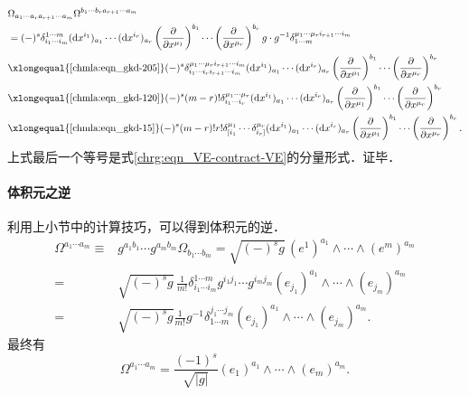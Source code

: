 \begin{align*}
    &\Omega_{a_1 \cdots a_r a_{r+1} \cdots a_m}
    \Omega^{{b_1 \cdots b_r} a_{r+1} \cdots a_m} \\
   &= (-)^s \delta_{i_1 \cdots i_m}^{1 \cdots m}
    ({\rm d}x^{i_{1}})_{a_{1}}  \cdots  ({\rm d}x^{i_r})_{a_r}
    \left(\frac{\partial }{\partial x^{\mu_1}}\right) ^{b_1} \cdots
    \left(\frac{\partial }{\partial x^{\mu_r}}\right) ^{b_r}
    g\cdot g^{-1}\delta^{\mu_1 \cdots\mu_r i_{r+1}\cdots i_m}_{1 \cdots m} \\
   &\xlongequal{\ref{chmla:eqn_gkd-205}} (-)^s
     \delta_{i_1 \cdots i_r i_{r+1}\cdots i_m}^{\mu_1 \cdots\mu_r i_{r+1}\cdots i_m}
    ({\rm d}x^{i_{1}})_{a_{1}}  \cdots  ({\rm d}x^{i_r})_{a_r}
    \left(\frac{\partial }{\partial x^{\mu_1}}\right) ^{b_1} \cdots
    \left(\frac{\partial }{\partial x^{\mu_r}}\right) ^{b_r} \\
   &\xlongequal{\ref{chmla:eqn_gkd-120}} (-)^s
   (m-r)! \delta^{\mu_1 \cdots \mu_{r}}_{i_1 \cdots i_{r}}
   ({\rm d}x^{i_{1}})_{a_{1}}  \cdots  ({\rm d}x^{i_r})_{a_r}
   \left(\frac{\partial }{\partial x^{\mu_1}}\right) ^{b_1} \cdots
   \left(\frac{\partial }{\partial x^{\mu_r}}\right) ^{b_r} \\
   &\xlongequal{\ref{chmla:eqn_gkd-15} } (-)^s (m-r)! r!
   \delta_{\lbrack i_1}^{\mu_1} \cdots \delta_{i_r \rbrack}^{\mu_r}
      ({\rm d}x^{i_{1}})_{a_{1}}  \cdots  ({\rm d}x^{i_r})_{a_r}
   \left(\frac{\partial }{\partial x^{\mu_1}}\right) ^{b_1} \cdots
   \left(\frac{\partial }{\partial x^{\mu_r}}\right) ^{b_r} .
\end{align*}
上式最后一个等号是式\eqref{chrg:eqn_VE-contract-VE}的分量形式．证毕． 

\paragraph{体积元之逆} 利用上小节中的计算技巧，可以得到体积元的逆．
\begin{align*}
	\Omega^{a_1 \cdots a_m} \equiv & g^{a_1 b_1} \cdots g^{a_m b_m} \Omega_{b_1\cdots b_m}
	=\sqrt{(-)^s g}\, (e^1)^{a_1} \wedge \cdots \wedge(e^m)^{a_m} \\
	=&\sqrt{(-)^s g}\, \frac{1}{m!} \delta^{1\cdots m}_{i_1\cdots i_m} 
	g^{i_1 j_1}\cdots g^{i_m j_m} (e_{j_1})^{a_1} \wedge \cdots \wedge(e_{j_m})^{a_m} \\
	=& \sqrt{(-)^s g} \frac{1}{m!} g^{-1} \delta_{1\cdots m}^{j_1\cdots j_m} 
	(e_{j_1})^{a_1} \wedge \cdots \wedge(e_{j_m})^{a_m}.
\end{align*}
最终有
\begin{equation}
	\Omega^{a_1 \cdots a_m} = \frac{(-1)^s}{\sqrt{|g|}} (e_{1})^{a_1} \wedge \cdots \wedge(e_{m})^{a_m} .
\end{equation}


